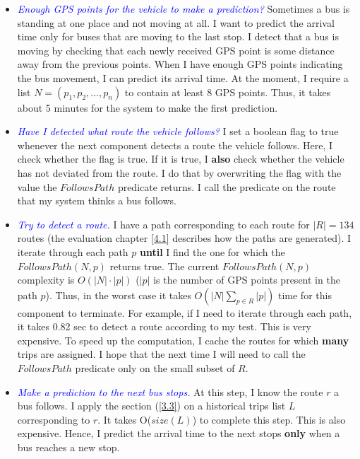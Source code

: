 \documentclass[12pt,a4paper,oneside,openright]{report}
\begin{document}
\begin{enumerate}
\begin{itemize}
\item \textit{\textcolor{blue}{Enough GPS points for the vehicle to make a prediction?}} Sometimes
a bus is standing at one place and not moving at all. I want to predict the arrival time only for
buses that are moving to the last stop. I detect that a bus is moving by
checking that each newly received GPS point is some distance away from the previous points. When
I have enough GPS points indicating the bus movement, I can predict its arrival time. At the moment,
I require a list $N = (p_1, p_2, ..., p_n)$ to contain at least 8 GPS points. Thus,
it takes about 5 minutes for the system to make the first prediction.

\item \textit{\textcolor{blue}{Have I detected what route the vehicle follows?}} I set a boolean
flag to true whenever the next component detects a route the vehicle follows. Here, I check
whether the flag is true. If it is true, I \textbf{also} check whether the vehicle has not deviated from the
route. I do that by overwriting the flag with the value the $FollowsPath$ predicate returns. I call the 
predicate on the route that my system thinks a bus follows.

\item \textit{\textcolor{blue}{Try to detect a route.}} I have a path corresponding to each
route for $|R| = 134$ routes (the evaluation chapter \textcolor{blue}{\ref{4.1}} describes
how the paths are generated). I iterate through each path $p$ \textbf{until} I find the one for
which the $FollowsPath(N, p)$ returns true. The current $FollowsPath(N, p)$ complexity is
$O(|N| \cdot |p|)$ ($|p|$ is the number of GPS points present in the path $p$). Thus,
in the worst case it takes $O(|N| \sum\nolimits_{p \in R} |p|)$ time for this component to terminate.
For example, if I need to iterate through each path, it takes 0.82 sec to detect a route according to my test.
This is very expensive. To speed up the computation, I cache the routes for
which \textbf{many} trips are assigned. I hope that the next time I will need to call the $FollowsPath$
predicate only on the small subset of $R$.

\item \textit{\textcolor{blue}{Make a prediction to the next bus stops.}} At this step, 
I know the route $r$ a bus follows. I apply the section (\textcolor{blue}{\ref{3.3}}) on a
historical trips list $L$ corresponding to $r$.
It takes O($size(L)$) to complete this step. This is also expensive. Hence, I predict the arrival
time to the next stops \textbf{only} when a bus reaches a new stop.


\end{itemize}
\end{enumerate}
\end{document}
